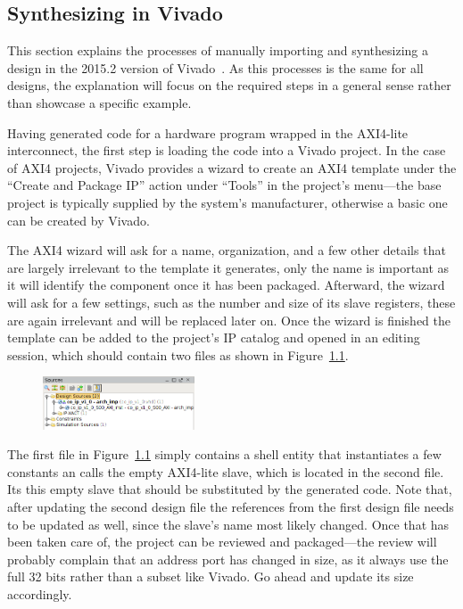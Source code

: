 \documentclass[licentiate,g5paper,gu]{chalmers-thesis}
\begin{document}
\begin{appendices}
\chapter{Synthesizing in Vivado}
\label{vivado}

This section explains the processes of manually importing and synthesizing a design in the 2015.2 version of Vivado~\cite{feist2012}. As this processes is the same for all designs, the explanation will focus on the required steps in a general sense rather than showcase a specific example.

Having generated code for a hardware program wrapped in the AXI4-lite interconnect, the first step is loading the code into a Vivado project. In the case of AXI4 projects, Vivado provides a wizard to create an AXI4 template under the  ``Create and Package IP'' action under ``Tools'' in the project's menu---the base project is typically supplied by the system's manufacturer, otherwise a basic one can be created by Vivado.

The AXI4 wizard will ask for a name, organization, and a few other details that are largely irrelevant to the template it generates, only the name is important as it will identify the component once it has been packaged. Afterward, the wizard will ask for a few settings, such as the number and size of its slave registers, these are again irrelevant and will be replaced later on. Once the wizard is finished the template can be added to the project's IP catalog and opened in an editing session, which should contain two files as shown in Figure~\ref{fig:files}.

\begin{figure}[h]
\includegraphics[width=0.4\textwidth]{figures/DesignFiles}
\centering
\caption{} %
\label{fig:files}
\end{figure}

The first file in Figure~\ref{fig:files} simply contains a shell entity that instantiates a few constants an calls the empty AXI4-lite slave, which is located in the second file. Its this empty slave that should be substituted by the generated code. Note that, after updating the second design file the references from the first design file needs to be updated as well, since the slave's name most likely changed. Once that has been taken care of, the project can be reviewed and packaged---the review will probably complain that an address port has changed in size, as it always use the full 32 bits rather than a subset like Vivado. Go ahead and update its size accordingly.


\end{appendices}
\end{document}
